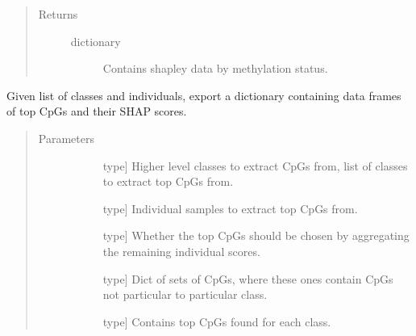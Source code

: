 \documentclass[letterpaper,10pt,english]{sphinxmanual}
\begin{document}
\begin{fulllineitems}
\begin{fulllineitems}
\begin{quote}
\begin{description}
\item[{Returns}] \leavevmode\begin{description}
\item[{dictionary}] \leavevmode
Contains shapley data by methylation status.

\end{description}

\end{description}\end{quote}

\end{fulllineitems}


\begin{fulllineitems}
\label{\detokenize{index:methylnet.interpretation_classes.ShapleyDataExplorer.return_top_cpgs}}
Given list of classes and individuals, export a dictionary containing data frames of top CpGs and their SHAP scores.
\begin{quote}\begin{description}
\item[{Parameters}] \leavevmode\begin{description}
\item[{}] \leavevmode{[}type{]}
Higher level classes to extract CpGs from, list of classes to extract top CpGs from.

\item[{}] \leavevmode{[}type{]}
Individual samples to extract top CpGs from.

\item[{}] \leavevmode{[}type{]}
Whether the top CpGs should be chosen by aggregating the remaining individual scores.

\item[{}] \leavevmode{[}type{]}
Dict of sets of CpGs, where these ones contain CpGs not particular to particular class.

\item[{}] \leavevmode{[}type{]}
Contains top CpGs found for each class.


\end{description}
\end{description}
\end{quote}
\end{fulllineitems}
\end{fulllineitems}
\end{document}
